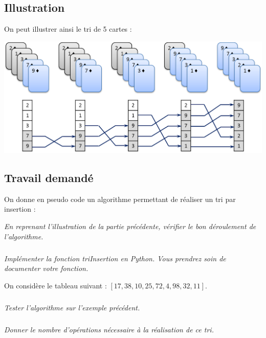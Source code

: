 \documentclass[11pt,oneside]{article}
\begin{document}
\subsection{Illustration}
On peut illustrer ainsi le tri de 5 cartes :
\begin{center}
\includegraphics[width=\textwidth]{png/insertion}
\end{center}

\subsection{Travail demandé}
On donne en pseudo code un algorithme permettant de réaliser un tri par insertion :

\begin{pseudo}
\begin{algorithm}[H]
\end{algorithm}
\end{pseudo}

\subparagrah{}
\textit{En reprenant l'illustration de la partie précédente, vérifier le bon déroulement de l'algorithme.}

\subparagraph{}
\textit{Implémenter la fonction \textsl{triInsertion} en Python. Vous prendrez soin de documenter votre fonction. }

On considère le tableau suivant : $[17,38,10,25,72,4,98,32,11]$.
\subparagraph{}
\textit{Tester l'algorithme sur l'exemple précédent.}

\subparagraph{}
\textit{Donner le nombre d'opérations nécessaire à la réalisation de ce tri.}
\end{document}
